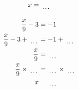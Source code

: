 \documentclass[12pt]{article}
\newcounter{minipagecount}
\begin{document}
\begin{multicols}{2}
\begin{minipage}[t]{0.45\textwidth}
\begin{align*}
        x &= \dotuline{\hspace{5mm}}\\
    \end{align*}
\end{minipage} %
\noindent{(\theminipagecount)}\hspace{0.1mm} %
\begin{minipage}[t]{0.45\textwidth} %
    \vspace{-26pt}  %
    \raggedright %
    \begin{align*} %
        \frac{x}{9} - 3 &= -1\\
        \frac{x}{9} - 3 + \dotuline{\hspace{5mm}} &= -1 + \dotuline{\hspace{5mm}}\\
        \frac{x}{9} &= \dotuline{\hspace{5mm}}\\
        \frac{x}{9} \times\dotuline{\hspace{5mm}} &= \dotuline{\hspace{5mm}} \times\dotuline{\hspace{5mm}}\\
        x &= \dotuline{\hspace{5mm}}\\
    \end{align*}
\end{minipage} %
\noindent{(\theminipagecount)}\hspace{0.1mm} %
\begin{minipage}[t]{0.45\textwidth} %
    \vspace{-26pt}  %

\end{minipage}
\end{multicols}
\end{document}
